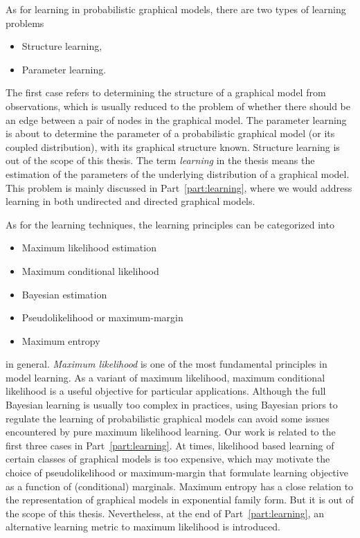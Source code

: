 As for learning in probabilistic graphical models, there are two types of learning problems
\begin{itemize}
\item Structure learning,
\item Parameter learning.
\end{itemize}
The first case refers to determining the structure of a graphical model from observations, which is usually reduced to the problem of whether there should be an edge between a pair of nodes in the graphical model. The parameter learning is about to determine the parameter of a probabilistic graphical model (or its coupled distribution), with its graphical structure known. Structure learning is out of the scope of this thesis. The term \textit{learning} in the thesis means the estimation of the parameters of the underlying distribution of a graphical model. This problem is mainly discussed in Part~\ref{part:learning}, where we would address learning in both undirected and directed graphical models. 


As for the learning techniques, the learning principles can be categorized into
\begin{itemize}
\item Maximum likelihood estimation
\item Maximum conditional likelihood
\item Bayesian estimation
\item Pseudolikelihood or maximum-margin
\item Maximum entropy
\end{itemize}
in general. \textit{Maximum likelihood} is one of the most fundamental principles in model learning. As a variant of maximum likelihood, maximum conditional likelihood is a useful objective for particular applications. Although the full Bayesian learning is usually too complex in practices, using Bayesian priors to regulate the learning of probabilistic graphical models can avoid some issues encountered by pure maximum likelihood learning.
Our work is related to the first three cases in Part~\ref{part:learning}. At times, likelihood based learning of certain classes of graphical models is too expensive, which may motivate the choice of pseudolikelihood or maximum-margin that formulate learning objective as a function of (conditional) marginals. Maximum entropy has a close relation to the representation of graphical models in exponential family form. But it is out of the scope of this thesis. Nevertheless, at the end of Part~\ref{part:learning}, an alternative learning metric to maximum likelihood is introduced.

